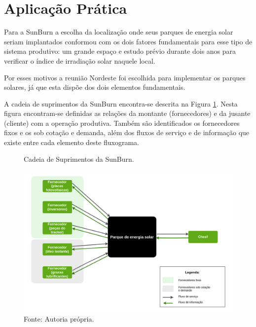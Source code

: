 \section{Aplicação Prática}
\label{sec:projetos_de_novas_aplicacao}
Para a SunBurn a escolha da localização onde seus parques de energia solar seriam implantados conformou com os dois fatores fundamentais para esse tipo de sistema produtivo: um grande espaço e estudo prévio durante dois anos para verificar o índice de irradiação solar naquele local.
\par Por esses motivos a reunião Nordeste foi escolhida para implementar os parques solares, já que esta dispõe dos dois elementos fundamentais.

\par A cadeia de suprimentos da SunBurn encontra-se descrita na Figura \ref{fig:cadeia_suprimentos_sunburn}. Nesta figura encontram-se definidas as relações da montante (fornecedores) e da jusante (cliente) com a operação produtiva. Também são identificados os fornecedores fixos e os sob cotação e demanda, além dos fluxos de serviço e de informação que existe entre cada elemento deste fluxograma.


\begin{figure}[H]
    \centering
    \caption{Cadeia de Suprimentos da SunBurn.}
    \includegraphics[width = \textwidth]{images/cadeia_suprimentos_sunburn.png}
    \caption*{Fonte: Autoria própria.}
    \label{fig:cadeia_suprimentos_sunburn}
\end{figure}

